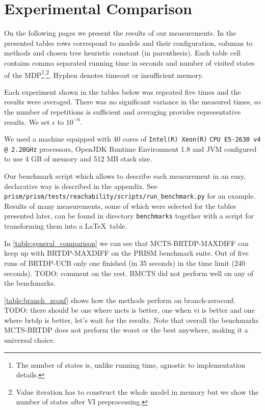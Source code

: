 \section{Experimental Comparison}

On the following pages we present the results of our measurements.
In the presented tables rows correspond to models and their
configuration, columns to methods and chosen tree heuristic constant (in
parenthesis). Each table cell contains comma separated running time in
seconds and number of visited states of the MDP\footnote{The number of
states is, unlike running time, agnostic to implementation details.}\textsuperscript{,}\footnote{Value iteration has to construct the
whole model in memory but we show the number of states after VI
preprocessing.}. Hyphen denotes timeout or insufficient memory.

Each experiment shown in the tables below was repeated five
times and the results were averaged. There was no significant
variance in the measured times, so the number of repetitions is
sufficient and averaging provides representative results. We set
$\epsilon$ to $10^{-6}$.

We used a machine equipped with
40 cores of \verb|Intel(R) Xeon(R)| \verb|CPU E5-2630 v4 @ 2.20GHz| processors,
OpenJDK Runtime Environment 1.8 and JVM configured to use 4 GB of memory
and 512 MB stack size.

Our benchmark script which allows to describe each measurement
in an easy, declarative way is described in the appendix. See
\verb|prism/prism/tests/reachability/scripts/run_benchmark.py| for
\linebreak an example.
Results of many measurements, some of which were selected for the tables
presented later, can be found in directory \linebreak \verb|benchmarks| together
with a script for transforming them into a \LaTeX\ table.

In \autoref{table:general_comparison} we can see that MCTS-BRTDP-MAXDIFF can
keep up with BRTDP-MAXDIFF on the PRISM benchmark suite. Out of five
runs of BRTDP-UCB only one finished (in 35 seconds) in the time limit
(240 seconds). TODO: comment on the rest. BMCTS did not perform well on
any of the benchmarks.

\autoref{table:branch_zconf} shows how the methods perform on
branch-zeroconf. TODO: there should be one where mcts is better, one
when vi is better and one where brtdp is better, let's wait for the
results.
Note that overall the benchmarks MCTS-BRTDP does
not perform the worst or the best anywhere, making it a universal choice.

